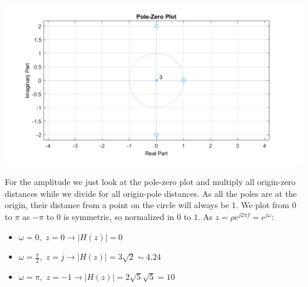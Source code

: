 {        \begin{center}
            \includegraphics[width=1\textwidth]{images/20220217_01.png}
        \end{center}
        For the amplitude we just look at the pole-zero plot and multiply all origin-zero distances while we divide for all origin-pole distances. As all the poles are at the origin, their distance from a point on the circle will always be 1. We plot from 0 to $\pi$ as $-\pi$ to $0$ is symmetric, so normalized in $0$ to $1$. As $z=\rho e^{j2\pi f}=e^{j\omega}$:
        \begin{itemize}
            \item $\omega=0,\,\,z=0\rightarrow|H(z)|=0$
            \item $\omega=\frac{\pi}{2},\,\,z=j\rightarrow|H(z)|=3\sqrt{2}\sim 4.24$
            \item $\omega=\pi,\,\,z=-1\rightarrow|H(z)|=2\sqrt{5}\sqrt{5}=10$
        \end{itemize}
    }


